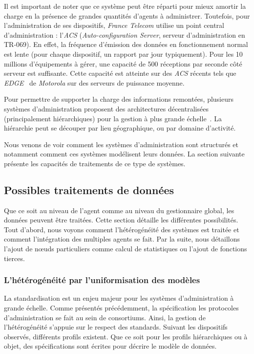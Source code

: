 Il est important de noter que ce système peut être réparti pour mieux amortir la charge en la présence de grandes quantités d'agents à administrer. Toutefois, pour l'administration de ses dispositifs, \textit{France Telecom} utilise un point central d'administration : l'\textit{ACS} (\textit{Auto-configuration Server}, serveur d'administration en TR-069). En effet, la fréquence d'émission des données en fonctionnement normal est lente (pour chaque dispositif, un rapport par jour typiquement). Pour les 10 millions d'équipements à gérer, une capacité de 500 réceptions par seconde côté serveur est suffisante. Cette capacité est atteinte sur des \textit{ACS} récents tels que \textit{EDGE}~\cite{Motorola:EDGE} de \textit{Motorola} sur des serveurs de puissance moyenne.

Pour permettre de supporter la charge des informations remontées, plusieurs systèmes d'administration proposent des architectures décentralisées (principalement hiérarchiques) pour la gestion à plus grande échelle~\cite{Kessis:management}. La hiérarchie peut se découper par lieu géographique, ou par domaine d'activité.

Nous venons de voir comment les systèmes d'administration sont structurés et notamment comment ces systèmes modélisent leurs données. La section suivante présente les capacités de traitements de ce type de systèmes.

\subsection{Possibles traitements de données}
Que ce soit au niveau de l'agent comme au niveau du gestionnaire global, les données peuvent être traitées. Cette section détaille les différentes possibilités. Tout d'abord, nous voyons comment l'hétérogénéité des systèmes est traitée et comment l'intégration des multiples agents se fait. Par la suite, nous détaillons l'ajout de nœuds particuliers comme calcul de statistiques ou l'ajout de fonctions tierces.

\subsubsection{L'hétérogénéité par l'uniformisation des modèles}
La standardisation est un enjeu majeur pour les systèmes d'administration à grande échelle. Comme présentés précédemment, la spécification les protocoles d'administration se fait au sein de consortiums. Ainsi, la gestion de l'hétérogénéité s'appuie sur le respect des standards. Suivant les dispositifs observés, différents profils existent. Que ce soit pour les profils hiérarchiques ou à objet, des spécifications sont écrites pour décrire le modèle de données.

